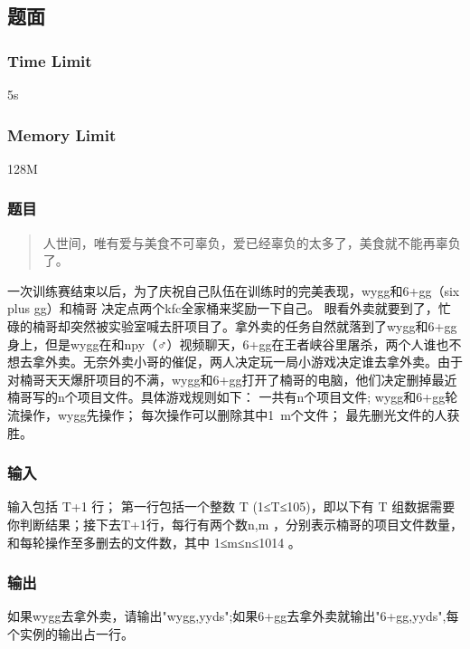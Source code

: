 \subsection{题面}

\subsubsection{Time Limit}
5s

\subsubsection{Memory Limit}
128M

\subsubsection{题目}
\begin{quote}
人世间，唯有爱与美食不可辜负，爱已经辜负的太多了，美食就不能再辜负了。
\end{quote}

一次训练赛结束以后，为了庆祝自己队伍在训练时的完美表现，wygg和6+gg（six plus gg）和楠哥 决定点两个kfc全家桶来奖励一下自己。
眼看外卖就要到了，忙碌的楠哥却突然被实验室喊去肝项目了。拿外卖的任务自然就落到了wygg和6+gg身上，但是wygg在和npy（♂）视频聊天，6+gg在王者峡谷里屠杀，两个人谁也不想去拿外卖。无奈外卖小哥的催促，两人决定玩一局小游戏决定谁去拿外卖。由于对楠哥天天爆肝项目的不满，wygg和6+gg打开了楠哥的电脑，他们决定删掉最近楠哥写的n个项目文件。具体游戏规则如下：
一共有n个项目文件;
wygg和6+gg轮流操作，wygg先操作；
每次操作可以删除其中1~m个文件；
最先删光文件的人获胜。

\subsubsection{输入}
输入包括 T+1 行；
第一行包括一个整数 T (1≤T≤105)，即以下有 T 组数据需要你判断结果；接下去T+1行，每行有两个数n,m ，分别表示楠哥的项目文件数量，和每轮操作至多删去的文件数，其中 1≤m≤n≤1014 。

\subsubsection{输出}
如果wygg去拿外卖，请输出"wygg,yyds";如果6+gg去拿外卖就输出"6+gg,yyds",每个实例的输出占一行。

